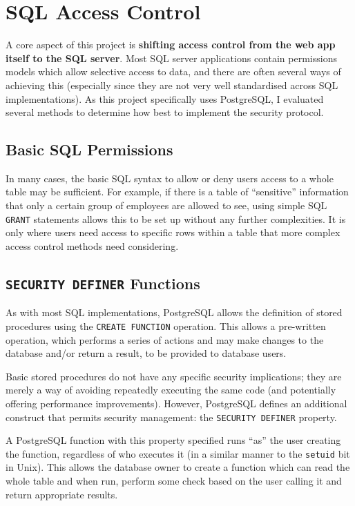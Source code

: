 \documentclass[12pt]{report}
\begin{document}
\section{SQL Access Control}
\label{sec:sql_access_control}
A core aspect of this project is \textbf{shifting access control from the web app itself to the SQL server}. Most SQL server applications contain permissions models which allow selective access to data, and there are often several ways of achieving this (especially since they are not very well standardised across SQL implementations). As this project specifically uses PostgreSQL, I evaluated several methods to determine how best to implement the security protocol.

\subsection{Basic SQL Permissions}
In many cases, the basic SQL syntax to allow or deny users access to a whole table may be sufficient. For example, if there is a table of ``sensitive'' information that only a certain group of employees are allowed to see, using simple SQL \texttt{GRANT} statements allows this to be set up without any further complexities. It is only where users need access to specific rows within a table that more complex access control methods need considering.

\subsection{\texttt{SECURITY DEFINER} Functions}
As with most SQL implementations, PostgreSQL allows the definition of stored procedures using the \texttt{CREATE FUNCTION} operation. This allows a pre-written operation, which performs a series of actions and may make changes to the database and/or return a result, to be provided to database users.

Basic stored procedures do not have any specific security implications; they are merely a way of avoiding repeatedly executing the same code (and potentially offering performance improvements). However, PostgreSQL defines an additional construct that permits security management: the \texttt{SECURITY DEFINER} property.

A PostgreSQL function with this property specified runs ``as'' the user creating the function, regardless of who executes it\cite{postgres-SEC_DEF} (in a similar manner to the \texttt{setuid} bit in Unix). This allows the database owner to create a function which can read the whole table and when run, perform some check based on the user calling it and return appropriate results.
\end{document}
